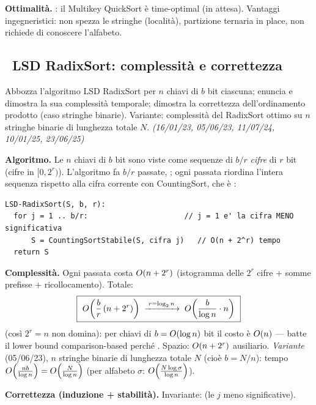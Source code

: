 \textbf{Ottimalit\`a.} : il Multikey QuickSort \`e
time-optimal (in attesa). Vantaggi ingegneristici: non spezza le stringhe (localit\`a), partizione
ternaria in place, non richiede di conoscere l'alfabeto.

\subsection*{\hot\ LSD RadixSort: complessit\`a e correttezza}

\begin{domanda}
Abbozza l'algoritmo LSD RadixSort per $n$ chiavi di $b$ bit ciascuna; enuncia e dimostra la sua
complessit\`a temporale; dimostra la correttezza dell'ordinamento prodotto (caso stringhe
binarie). Variante: complessit\`a del RadixSort ottimo su $n$ stringhe binarie di lunghezza totale
$N$. \emph{(16/01/23, 05/06/23, 11/07/24, 10/01/25, 23/06/25)}
\end{domanda}

\textbf{Algoritmo.} Le $n$ chiavi di $b$ bit sono viste come sequenze di $b/r$ \emph{cifre} di $r$
bit (cifre in $[0,2^r)$). L'algoritmo fa $b/r$ passate, ; ogni passata riordina l'intera sequenza rispetto alla cifra corrente con
CountingSort, che \`e :

\begin{verbatim}
LSD-RadixSort(S, b, r):
  for j = 1 .. b/r:                      // j = 1 e' la cifra MENO significativa
      S = CountingSortStabile(S, cifra j)   // O(n + 2^r) tempo
  return S
\end{verbatim}

\textbf{Complessit\`a.} Ogni passata costa $O\!\left(n+2^r\right)$ (istogramma delle $2^r$ cifre + somme
prefisse + ricollocamento). Totale:
\[
\boxed{\ O\!\left(\frac{b}{r}\,(n+2^r)\right)
\;\xrightarrow{\;r=\log_2 n\;}\;
O\!\left(\frac{b}{\log n}\cdot n\right)\ }
\]
 (cos\`i $2^r=n$ non domina): per chiavi di $b=O\!\left(\log n\right)$
bit il costo \`e $O\!\left(n\right)$ --- batte il lower bound comparison-based perch\'e . Spazio: $O\!\left(n+2^r\right)$ ausiliario. \emph{Variante} (05/06/23), $n$ stringhe
binarie di lunghezza totale $N$ (cio\`e $b=N/n$): tempo
$O\!\left(\frac{nb}{\log n}\right)=O\!\left(\frac{N}{\log n}\right)$ (per alfabeto $\sigma$:
$O\!\left(\frac{N\log\sigma}{\log n}\right)$).

\textbf{Correttezza (induzione + stabilit\`a).} Invariante:  (le $j$ meno significative).

